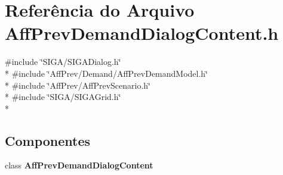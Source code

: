 \section{Referência do Arquivo Aff\+Prev\+Demand\+Dialog\+Content.\+h}
\label{_demand_2_aff_prev_demand_dialog_content_8h}
{\ttfamily \#include \char`\"{}S\+I\+G\+A/\+S\+I\+G\+A\+Dialog.\+h\char`\"{}}\\*
{\ttfamily \#include \char`\"{}Aff\+Prev/\+Demand/\+Aff\+Prev\+Demand\+Model.\+h\char`\"{}}\\*
{\ttfamily \#include \char`\"{}Aff\+Prev/\+Aff\+Prev\+Scenario.\+h\char`\"{}}\\*
{\ttfamily \#include \char`\"{}S\+I\+G\+A/\+S\+I\+G\+A\+Grid.\+h\char`\"{}}\\*
\subsection*{Componentes}
\begin{DoxyCompactItemize}
\item 
class {\bf Aff\+Prev\+Demand\+Dialog\+Content}
\end{DoxyCompactItemize}
